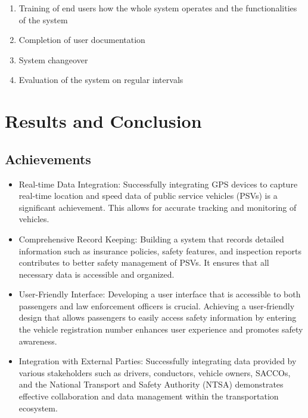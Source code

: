 \documentclass[a4paper, 12pt]{report}
\begin{document}
\begin{enumerate}
    \item Training of end users how the whole system operates and the functionalities of the system
    \item Completion of user documentation
    \item System changeover
    \item Evaluation of the system on regular intervals
\end{enumerate}

\chapter{Results and Conclusion}
\section{Achievements}
\begin{itemize}
    \item Real-time Data Integration: Successfully integrating GPS devices to capture real-time location and speed data of public service vehicles (PSVs) is a significant achievement. This allows for accurate tracking and monitoring of vehicles.
    \item Comprehensive Record Keeping: Building a system that records detailed information such as insurance policies, safety features, and inspection reports contributes to better safety management of PSVs. It ensures that all necessary data is accessible and organized.
    \item User-Friendly Interface: Developing a user interface that is accessible to both passengers and law enforcement officers is crucial. Achieving a user-friendly design that allows passengers to easily access safety information by entering the vehicle registration number enhances user experience and promotes safety awareness.
    \item Integration with External Parties: Successfully integrating data provided by various stakeholders such as drivers, conductors, vehicle owners, SACCOs, and the National Transport and Safety Authority (NTSA) demonstrates effective collaboration and data management within the transportation ecosystem.
\end{itemize}
\end{document}
